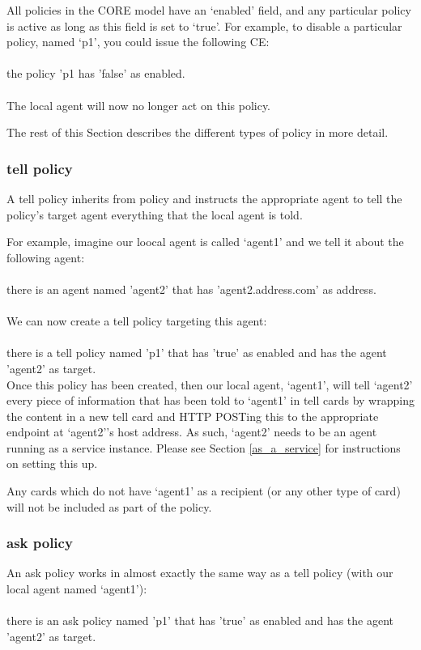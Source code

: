 \documentclass{scrartcl}
\newcommand{\ce}[1]{\textsf{#1}}
\begin{document}
All policies in the CORE model have an `enabled' field, and any particular policy is active as long as this field is set to `true'. For example, to disable a particular policy, named `p1', you could issue the following CE:\\
\\\ce{the policy 'p1 has 'false' as enabled.}\\
\\The local agent will now no longer act on this policy.

The rest of this Section describes the different types of policy in more detail.

\subsubsection{\ce{tell policy}}
A \ce{tell policy} inherits from \ce{policy} and instructs the appropriate agent to tell the policy's target agent everything that the local agent is told.

For example, imagine our loocal agent is called `agent1' and we tell it about the following agent:\\
\\\ce{there is an agent named 'agent2' that has 'agent2.address.com' as address.}\\
\\We can now create a tell policy targeting this agent:\\
\\\ce{there is a tell policy named 'p1' that has 'true' as enabled and has the agent 'agent2' as target.}\\

Once this policy has been created, then our local agent, `agent1', will tell `agent2' every piece of information that has been told to `agent1' in tell cards by wrapping the content in a new tell card and HTTP POSTing this to the appropriate endpoint at `agent2''s host address. As such, `agent2' needs to be an agent running as a service instance. Please see Section \ref{as_a_service} for instructions on setting this up.

Any cards which do not have `agent1' as a recipient (or any other type of card) will not be included as part of the policy.

\subsubsection{\ce{ask policy}}
An \ce{ask policy} works in almost exactly the same way as a tell policy (with our local agent named `agent1'):\\
\\\ce{there is an ask policy named 'p1' that has 'true' as enabled and has the agent 'agent2' as target.}\\
\end{document}
